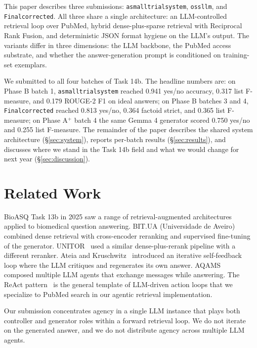 \documentclass[sigconf,natbib=true]{ceurart}
\begin{document}
This paper describes three submissions: \texttt{asmalltrialsystem}, \texttt{ossllm}, and \texttt{Finalcorrected}. All three share a single architecture: an LLM-controlled retrieval loop over PubMed, hybrid dense-plus-sparse retrieval with Reciprocal Rank Fusion, and deterministic JSON format hygiene on the LLM's output. The variants differ in three dimensions: the LLM backbone, the PubMed access substrate, and whether the answer-generation prompt is conditioned on training-set exemplars.

We submitted to all four batches of Task 14b. The headline numbers are: on Phase B batch 1, \texttt{asmalltrialsystem} reached 0.941 yes/no accuracy, 0.317 list F-measure, and 0.179 ROUGE-2 F1 on ideal answers; on Phase B batches 3 and 4, \texttt{Finalcorrected} reached 0.813 yes/no, 0.364 factoid strict, and 0.365 list F-measure; on Phase A$^+$ batch 4 the same Gemma 4 generator scored 0.750 yes/no and 0.255 list F-measure. The remainder of the paper describes the shared system architecture (\S\ref{sec:system}), reports per-batch results (\S\ref{sec:results}), and discusses where we stand in the Task 14b field and what we would change for next year (\S\ref{sec:discussion}).


\section{Related Work}
\label{sec:related}

BioASQ Task 13b in 2025 saw a range of retrieval-augmented architectures applied to biomedical question answering. BIT.UA (Universidade de Aveiro)~\cite{bitua2025} combined dense retrieval with cross-encoder reranking and supervised fine-tuning of the generator. UNITOR~\cite{unitor2025} used a similar dense-plus-rerank pipeline with a different reranker. Ateia and Kruschwitz~\cite{ateia2025} introduced an iterative self-feedback loop where the LLM critiques and regenerates its own answer. AQAMS~\cite{aqams2025} composed multiple LLM agents that exchange messages while answering. The ReAct pattern~\cite{react} is the general template of LLM-driven action loops that we specialize to PubMed search in our agentic retrieval implementation.

Our submission concentrates agency in a single LLM instance that plays both controller and generator roles within a forward retrieval loop. We do not iterate on the generated answer, and we do not distribute agency across multiple LLM agents.
\end{document}
